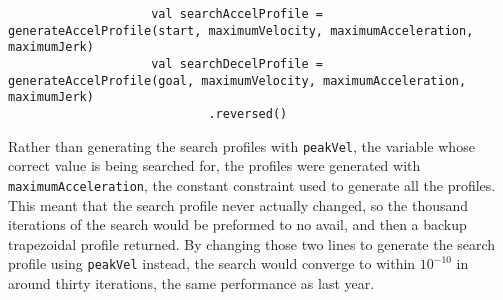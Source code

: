 \documentclass{article}
\begin{document}
\begin{lstlisting}
                    val searchAccelProfile = generateAccelProfile(start, maximumVelocity, maximumAcceleration, maximumJerk)
                    val searchDecelProfile = generateAccelProfile(goal, maximumVelocity, maximumAcceleration, maximumJerk)
                            .reversed()
\end{lstlisting}

Rather than generating the search profiles with \texttt{peakVel}, the variable whose correct value is being searched for, the profiles were generated with \texttt{maximumAcceleration}, the constant constraint used to generate all the profiles. This meant that the search profile never actually changed, so the thousand iterations of the search would be preformed to no avail, and then a backup trapezoidal profile returned. By changing those two  lines to generate the search profile using \texttt{peakVel} instead, the search would converge to within $10^{-10}$ in around thirty iterations, the same performance as last year. 
\end{document}
